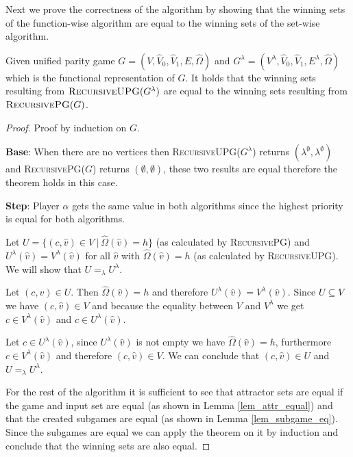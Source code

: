 Next we prove the correctness of the algorithm by showing that the winning sets of the function-wise algorithm are equal to the winning sets of the set-wise algorithm.
\begin{theorem}
	Given unified parity game ${G} = ({V},\hat{V}_0,\hat{V}_1, {E}, \hat{\Omega})$ and $G^\lambda = (V^\lambda, \hat{V}_0, \hat{V}_1, E^\lambda,\hat{\Omega})$ which is the functional representation of $G$. It holds that the winning sets resulting from $\textsc{RecursiveUPG}({G}^\lambda)$ are equal to the winning sets resulting from $\textsc{RecursivePG}({G})$.
	\begin{proof}
		Proof by induction on $G$.
		
		\textbf{Base}: When there are no vertices then \textsc{RecursiveUPG($G^\lambda$)} returns $(\lambda^\emptyset,\lambda^\emptyset)$ and \textsc{RecursivePG($G$)} returns $(\emptyset,\emptyset)$, these two results are equal therefore the theorem holds in this case.
		
		\textbf{Step}: Player $\alpha$ gets the same value in both algorithms since the highest priority is equal for both algorithms.
		
		Let $U = \{(c,\hat{v}) \in V\ |\ \hat{\Omega}(\hat{v}) = h \}$ (as calculated by \textsc{RecursivePG}) and $U^\lambda(\hat{v}) = V^\lambda(\hat{v})$ for all $\hat{v}$ with $\hat{\Omega}(\hat{v}) = h$ (as calculated by \textsc{RecursiveUPG}). We will show that $U =_\lambda U^\lambda$.
		
		Let $(c,\hat{v}) \in U$. Then $\hat{\Omega}(\hat{v}) = h$ and therefore $U^\lambda(\hat{v}) = V^\lambda(\hat{v})$. Since $U \subseteq V$ we have $(c,\hat{v}) \in V$ and because the equality between $V$ and $V^\lambda$ we get $c \in V^\lambda(\hat{v})$ and $c \in U^\lambda(\hat{v})$.
		
		Let $c \in U^\lambda(\hat{v})$, since $U^\lambda(\hat{v})$ is not empty we have $\hat{\Omega}(\hat{v}) = h$, furthermore $c \in V^\lambda(\hat{v})$ and therefore $(c,\hat{v}) \in V$. We can conclude that $(c, \hat{v}) \in U$ and $U =_\lambda U^\lambda$.
		
		For the rest of the algorithm it is sufficient to see that attractor sets are equal if the game and input set are equal (as shown in Lemma \ref{lem_attr_equal}) and that the created subgames are equal (as shown in Lemma \ref{lem_subgame_eq}). Since the subgames are equal we can apply the theorem on it by induction and conclude that the winning sets are also equal.
	\end{proof}
\end{theorem}

